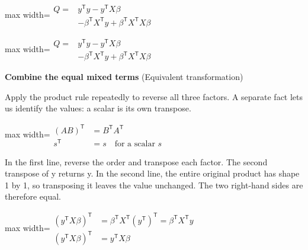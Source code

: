 \documentclass[11pt,a4paper]{article}
\begin{document}
\begin{center}\begin{adjustbox}{max width=\linewidth}$\displaystyle \begin{aligned}Q={}&y^{\mathsf T}y-y^{\mathsf T}X\beta\\ &-\beta^{\mathsf T}X^{\mathsf T}y+\beta^{\mathsf T}X^{\mathsf T}X\beta\end{aligned}$\end{adjustbox}\end{center}

\begin{center}\begin{adjustbox}{max width=\linewidth}$\displaystyle \begin{aligned}Q={}&y^{\mathsf T}y-y^{\mathsf T}X\beta\\ &-\beta^{\mathsf T}X^{\mathsf T}y+\beta^{\mathsf T}X^{\mathsf T}X\beta\end{aligned}$\end{adjustbox}\end{center}
\noindent\textbf{Combine the equal mixed terms} (Equivalent transformation)\par
Apply the product rule repeatedly to reverse all three factors. A separate fact lets us identify the values: a scalar is its own transpose.
\begin{center}\begin{adjustbox}{max width=\linewidth}$\displaystyle \begin{aligned}(AB)^{\mathsf T}&=B^{\mathsf T}A^{\mathsf T}\\ s^{\mathsf T}&=s\quad\text{for a scalar }s\end{aligned}$\end{adjustbox}\end{center}

In the first line, reverse the order and transpose each factor. The second transpose of y returns y. In the second line, the entire original product has shape 1 by 1, so transposing it leaves the value unchanged. The two right-hand sides are therefore equal.
\begin{center}\begin{adjustbox}{max width=\linewidth}$\displaystyle \begin{aligned}(y^{\mathsf T}X\beta)^{\mathsf T}&=\beta^{\mathsf T}X^{\mathsf T}(y^{\mathsf T})^{\mathsf T}=\beta^{\mathsf T}X^{\mathsf T}y\\ (y^{\mathsf T}X\beta)^{\mathsf T}&=y^{\mathsf T}X\beta\end{aligned}$\end{adjustbox}\end{center}
\end{document}
